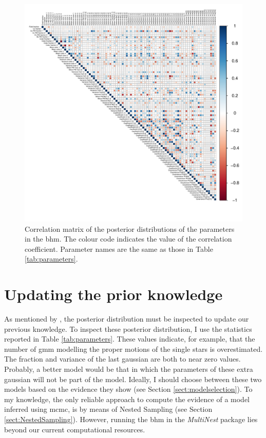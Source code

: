 

\begin{figure}[ht!]
\begin{center}
\includegraphics[page=1,width=1.1\textwidth]{background/Figures/BHM/Correlations.pdf}
\caption{Correlation matrix of the posterior distributions of the parameters in the \gls{bhm}. The colour code indicates the value of the correlation coefficient. Parameter names are the same as those in Table \ref{tab:parameters}.}
\label{fig:correlations}
\end{center}
\end{figure}

\section{Updating the prior knowledge}
\label{sect:updating_priors}
As mentioned by \citet{Gelman2006}, the posterior distribution must be inspected to update our previous knowledge. To inspect these posterior distribution, I use the statistics reported in Table \ref{tab:parameters}. These values indicate, for example, that the number of  \gls{gmm} modelling the proper motions of the single stars is overestimated. The fraction and variance of the last gaussian are both to near zero values. Probably, a better model would be that in which the parameters of these extra gaussian will not be part of the model. Ideally, I should choose between these two models based on the evidence they show (see Section \ref{sect:modelselection}). To my knowledge, the only reliable approach to compute the evidence of a model inferred using \gls{mcmc}, is by means of Nested Sampling (see Section \ref{sect:NestedSampling}). However, running the \gls{bhm} in the \emph{MultiNest} package lies beyond our current computational resources.

